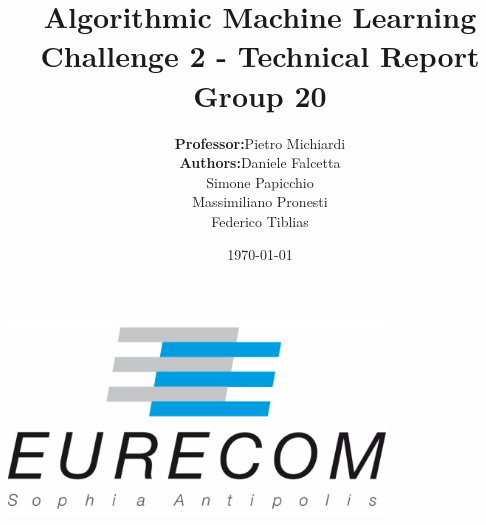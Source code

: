 \title{\Large Algorithmic Machine Learning  \\[0.5cm]
	\bf\Large Challenge 2 - Technical Report \\[0.5cm]
	
	\bf\Large Group 20}

\author{\large 
	\begin{tabular}{rl}
		\textbf{Professor:} & Pietro Michiardi \\
		\textbf{Authors:} & Daniele Falcetta \\ & Simone Papicchio \\ & Massimiliano Pronesti \\ & Federico Tiblias
	\end{tabular}
	}
\date{\large \today}

\makeatletter
\begin{titlepage}
	\begin{center}
		{ \includegraphics[width=10cm]{../../eurecom.png}}
		{\ \\ \ \\}
		\vbox{}\vspace{5cm}
		{\@title }\\[3cm]
		{\@author}\\[3cm]
		{\@date\\}
		
	\end{center}
\end{titlepage}
\makeatother